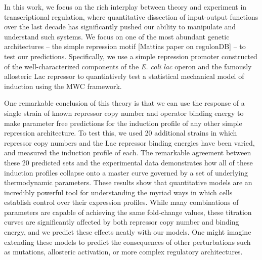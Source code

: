 In this work, we focus on the rich interplay between theory and experiment in
transcriptional regulation, where quantitative dissection of input-output
functions over the last decade has significantly pushed our ability to
manipulate and understand such systems. We focus on one of the
most abundant genetic architectures -- the simple repression motif [Mattias
paper on regulonDB] -- to test our predictions. Specifically, we use a simple repression promoter constructed of the
well-characterized components of the \textit{E. coli lac}
operon and the famously allosteric Lac repressor to quantiatively test a statistical mechanical model of induction using the MWC framework.

One remarkable conclusion of this theory is that we can use the response of
a single strain of known repressor copy number and operator binding energy to
make parameter free predictions for the induction profile of any other simple
repression architecture. To test this, we used 20 additional strains in which
repressor copy numbers and the Lac repressor binding energies have been varied,
and measured the induction profile of each. The remarkable agreement between
these 20 predicted sets and the experimental data demonstrates how all of these
induction profiles collapse onto a master curve governed by a set of underlying
thermodynamic parameters. These results show that quantitative models are an incredibly powerful tool for
understanding the myriad ways in which cells establish control over
their expression profiles. While many combinations of parameters are capable of
achieving the same fold-change values, these titration
curves are significantly affected by both repressor copy number and binding
energy, and we predict these effects neatly with our models. One might imagine
extending these models to predict the consequences of other perturbations such
as mutations, allosteric activation, or more complex regulatory architectures.
